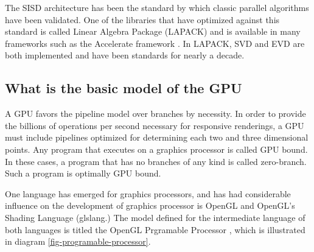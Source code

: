\documentclass[11pt]{article}
\begin{document}
The SISD architecture has been the standard by which classic parallel algorithms have been validated.  One of the libraries that have optimized against this standard is called Linear Algebra Package (LAPACK) and is available in many frameworks such as the Accelerate framework \cite{apple-accelerate-framework}.  In LAPACK, SVD and EVD are both implemented and have been standards for nearly a decade.  



\subsection{What is the basic model of the GPU}

A GPU favors the pipeline model over branches by necessity.  In order to provide the billions of operations per second necessary for responsive renderings, a GPU must include pipelines optimized for determining each two and three dimensional points.   Any program that executes on a graphics processor is called GPU bound.  In these cases, a program that has no branches of any kind is called zero-branch.  Such a program is optimally GPU bound.

One language has emerged for graphics processors, and has had considerable influence on the development of graphics processor is OpenGL and OpenGL's Shading Language (glslang.)  The model defined for the intermediate language of both languages is titled the OpenGL Prgramable Processor \cite{glslRost}, which is illustrated in diagram \ref{fig-programable-processor}.  
\end{document}

